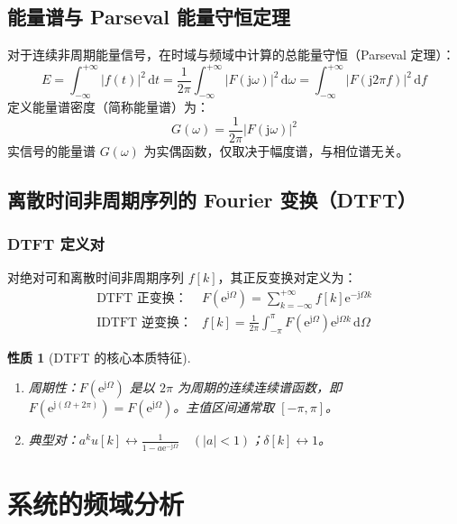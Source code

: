 \documentclass[11pt,a4paper,fontset=fandol]{ctexart}
\newtheorem{property}[theorem]{性质}
\theoremstyle{remark}
\begin{document}
\subsection{能量谱与 Parseval 能量守恒定理}
对于连续非周期能量信号，在时域与频域中计算的总能量守恒（Parseval 定理）：
\begin{equation}
    E = \int_{-\infty}^{+\infty} |f(t)|^2\,\mathrm{d}t = \frac{1}{2\pi} \int_{-\infty}^{+\infty} |F(\mathrm{j}\omega)|^2\,\mathrm{d}\omega = \int_{-\infty}^{+\infty} |F(\mathrm{j}2\pi f)|^2\,\mathrm{d}f
\end{equation}
定义能量谱密度（简称能量谱）为：
\begin{equation}
    G(\omega) = \frac{1}{2\pi} |F(\mathrm{j}\omega)|^2
\end{equation}
实信号的能量谱 $G(\omega)$ 为实偶函数，仅取决于幅度谱，与相位谱无关。

\subsection{离散时间非周期序列的 Fourier 变换（DTFT）}

\subsubsection{DTFT 定义对}
对绝对可和离散时间非周期序列 $f[k]$，其正反变换对定义为：
\begin{align}
    \text{DTFT 正变换}：& F(\mathrm{e}^{\mathrm{j}\Omega}) = \sum_{k=-\infty}^{+\infty} f[k]\mathrm{e}^{-\mathrm{j}\Omega k} \\
    \text{IDTFT 逆变换}：& f[k] = \frac{1}{2\pi} \int_{-\pi}^{\pi} F(\mathrm{e}^{\mathrm{j}\Omega})\mathrm{e}^{\mathrm{j}\Omega k}\,\mathrm{d}\Omega
\end{align}
\begin{property}[DTFT 的核心本质特征]
\begin{enumerate}
    \item 周期性：$F(\mathrm{e}^{\mathrm{j}\Omega})$ 是以 $2\pi$ 为周期的连续连续谱函数，即 $F(\mathrm{e}^{\mathrm{j}(\Omega + 2\pi)}) = F(\mathrm{e}^{\mathrm{j}\Omega})$。主值区间通常取 $[-\pi, \pi]$。
    \item 典型对：$a^k u[k] \longleftrightarrow \frac{1}{1 - a\mathrm{e}^{-\mathrm{j}\Omega}} \quad (|a| < 1)$；$\delta[k] \longleftrightarrow 1$。
\end{enumerate}
\end{property}

\section{系统的频域分析}
\end{document}

